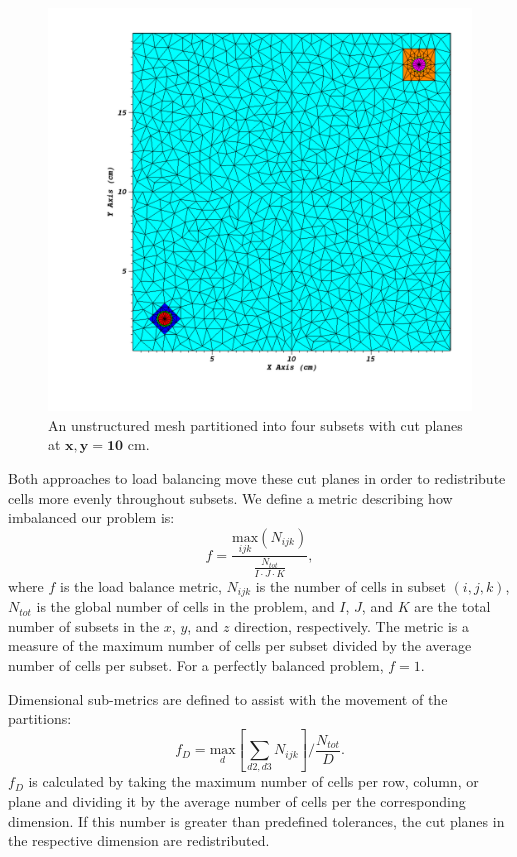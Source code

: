 \begin{figure}[H]
\centering
\includegraphics[scale=0.4,trim={0.95in 0.64in 0.35in 0.44in},clip]{Figures/partitioning_example.pdf}
\caption{An unstructured mesh partitioned into four subsets with cut planes at $\bm{x,y = 10}$ cm.}
\label{partitioning_example}
\end{figure}
Both approaches to load balancing move these cut planes in order to redistribute cells more evenly throughout subsets. We define a metric describing how imbalanced our problem is:
\begin{equation}
f =\frac{\underset{ijk}{\text{max}}(N_{ijk})}{\frac{N_{tot}}{I\cdot J\cdot K}},
\label{metric_def}
\end{equation}
where $f$ is the load balance metric, $N_{ijk}$ is the number of cells in subset $(i,j,k)$, $N_{tot}$ is the global number of cells in the problem, and $I$, $J$, and $K$ are the total number of subsets in the $x$, $y$, and $z$ direction, respectively. The metric is a measure of the maximum number of cells per subset divided by the average number of cells per subset. For a perfectly balanced problem, $f = 1$.

Dimensional sub-metrics are defined to assist with the movement of the partitions:
\begin{equation}
f_{D} = \underset{d}{\text{max}}[\sum_{d2,d3} N_{ijk}]/\frac{N_{tot}}{D}.
\label{f_d}
\end{equation}
$f_{D}$ is calculated by taking the maximum number of cells per row, column, or plane and dividing it by the average number of cells per the corresponding dimension. If this number is greater than predefined tolerances, the cut planes in the respective dimension are redistributed. 

